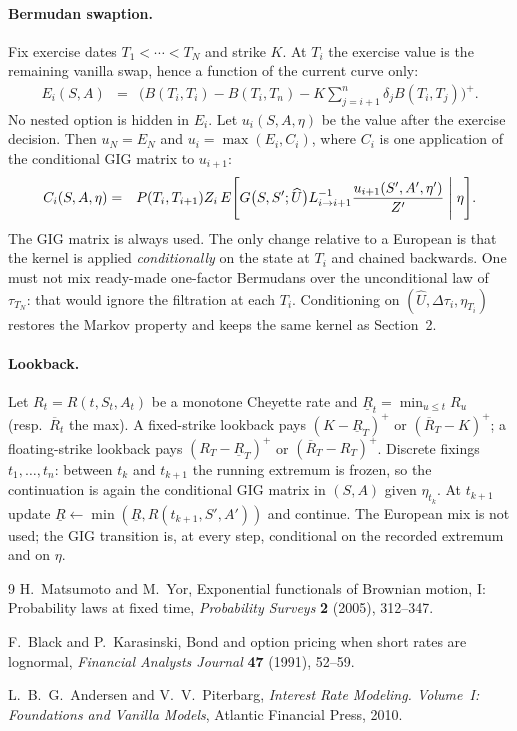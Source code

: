 \documentclass[12pt,a4paper,final]{article}
\theoremstyle{plain}
\begin{document}
\paragraph{Bermudan swaption.}
Fix exercise dates $T_1<\cdots<T_N$ and strike $K$. At $T_i$ the exercise
value is the remaining vanilla swap, hence a function of the current curve
only:
\begin{eqnarray*}
E_i(S,A)
&=&
\Biggl(
B(T_i,T_i)-B(T_i,T_n)
-K\sum_{j=i+1}^{n}\delta_j B(T_i,T_j)
\Biggr)^{+}.
\end{eqnarray*}
No nested option is hidden in $E_i$. Let $u_i(S,A,\eta)$ be the value
after the exercise decision. Then $u_N=E_N$ and
$u_i=\max(E_i,C_i)$, where $C_i$ is one application of the conditional
GIG matrix to $u_{i+1}$:
\begin{eqnarray*}
C_i(S,A,\eta)
&=&
P(T_i,T_{i+1})Z_i\,
E\Biggl[
G\bigl(S,S';\widehat U\bigr)
L_{i\to i+1}^{-1}
\frac{u_{i+1}(S',A',\eta')}{Z'}
\Biggm|\eta\Biggr].
\end{eqnarray*}
The GIG matrix is always used. The only change relative to a European is
that the kernel is applied \emph{conditionally} on the state at $T_i$ and
chained backwards. One must not mix ready-made one-factor Bermudans over
the unconditional law of $\tau_{T_N}$: that would ignore the filtration at
each $T_i$. Conditioning on $(\widehat U,\Delta\tau_i,\eta_{T_i})$ restores
the Markov property and keeps the same kernel as Section~2.

\paragraph{Lookback.}
Let $R_t=R(t,S_t,A_t)$ be a monotone Cheyette rate and
$\underline{R}_t=\min_{u\le t}R_u$ (resp.\ $\overline{R}_t$ the max).
A fixed-strike lookback pays $(K-\underline{R}_T)^{+}$ or
$(\overline{R}_T-K)^{+}$; a floating-strike lookback pays
$(R_T-\underline{R}_T)^{+}$ or $(\overline{R}_T-R_T)^{+}$. Discrete
fixings $t_1,\ldots,t_n$: between $t_k$ and $t_{k+1}$ the running
extremum is frozen, so the continuation is again the conditional GIG
matrix in $(S,A)$ given $\eta_{t_k}$. At $t_{k+1}$ update
$\underline{R}\leftarrow\min(\underline{R},R(t_{k+1},S',A'))$ and
continue. The European mix is not used; the GIG transition is, at every
step, conditional on the recorded extremum and on $\eta$.

\begin{thebibliography}{9}
H.~Matsumoto and M.~Yor,
Exponential functionals of Brownian motion, I: Probability laws at fixed time,
\textit{Probability Surveys} \textbf{2} (2005), 312--347.

F.~Black and P.~Karasinski,
Bond and option pricing when short rates are lognormal,
\textit{Financial Analysts Journal} \textbf{47} (1991), 52--59.

L.~B.~G.~Andersen and V.~V.~Piterbarg,
\textit{Interest Rate Modeling. Volume~I: Foundations and Vanilla Models},
Atlantic Financial Press, 2010.
\end{thebibliography}
\end{document}
